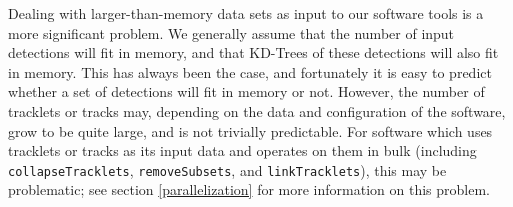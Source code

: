 Dealing with larger-than-memory data sets as input to our software
tools is a more significant problem.  We generally assume that the
number of input detections will fit in memory, and that KD-Trees of
these detections will also fit in memory.  This has always been the
case, and fortunately it is easy to predict whether a set of
detections will fit in memory or not.  However, the number of
tracklets or tracks may, depending on the data and configuration of
the software, grow to be quite large, and is not trivially
predictable.  For software which uses tracklets or tracks as its input
data and operates on them in bulk (including {\tt collapseTracklets},
{\tt removeSubsets}, and {\tt linkTracklets}), this may be problematic;
see section \ref{parallelization} for more information on this
problem.







